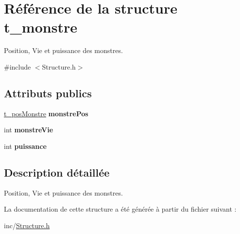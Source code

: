 \hypertarget{structt__monstre}{}\section{Référence de la structure t\+\_\+monstre}
\label{structt__monstre}


Position, Vie et puissance des monstres.  




{\ttfamily \#include $<$Structure.\+h$>$}

\subsection*{Attributs publics}
\begin{DoxyCompactItemize}
\item 
\hypertarget{structt__monstre_a8855f26f2d4bd43f16ae5d3b7bc81108}{}\hyperlink{structt__posMonstre}{t\+\_\+pos\+Monstre} {\bfseries monstre\+Pos}\label{structt__monstre_a8855f26f2d4bd43f16ae5d3b7bc81108}

\item 
\hypertarget{structt__monstre_ad18d6d6975728cb3c4dca3c0b1948125}{}int {\bfseries monstre\+Vie}\label{structt__monstre_ad18d6d6975728cb3c4dca3c0b1948125}

\item 
\hypertarget{structt__monstre_a2ccfcae2fdc412232d7d549ba4142dd8}{}int {\bfseries puissance}\label{structt__monstre_a2ccfcae2fdc412232d7d549ba4142dd8}

\end{DoxyCompactItemize}


\subsection{Description détaillée}
Position, Vie et puissance des monstres. 

La documentation de cette structure a été générée à partir du fichier suivant \+:\begin{DoxyCompactItemize}
\item 
inc/\hyperlink{Structure_8h}{Structure.\+h}\end{DoxyCompactItemize}

